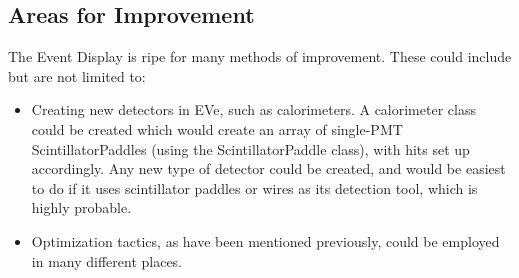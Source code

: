 \documentclass[12pt]{article}
\numberwithin{equation}{section}
\begin{document}
\subsection{Areas for Improvement}
The Event Display is ripe for many methods of improvement. These could include but are not limited to:
\begin{itemize}
\item Creating new detectors in EVe, such as calorimeters. A calorimeter class could be created which would create an array of single-PMT ScintillatorPaddles (using the ScintillatorPaddle class), with hits set up accordingly. Any new type of detector could be created, and would be easiest to do if it uses scintillator paddles or wires as its detection tool, which is highly probable.
\item Optimization tactics, as have been mentioned previously, could be employed in many different places.

\end{itemize}
\end{document}
